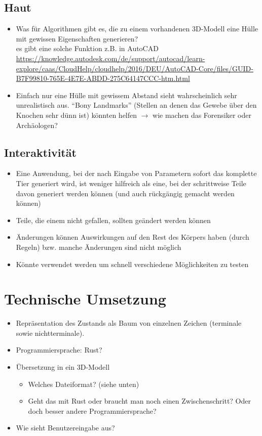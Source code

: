 \section{Haut}

\begin{itemize}
 \item Was für Algorithmen gibt es, die zu einem vorhandenen 3D-Modell eine Hülle mit gewissen Eigenschaften generieren? \\
 es gibt eine solche Funktion z.B. in AutoCAD \url{https://knowledge.autodesk.com/de/support/autocad/learn-explore/caas/CloudHelp/cloudhelp/2016/DEU/AutoCAD-Core/files/GUID-B7F99810-765E-4E7E-ABDD-275C64147CCC-htm.html}
 \item Einfach nur eine Hülle mit gewissem Abstand sieht wahrscheinlich sehr unrealistisch aus. "`Bony Landmarks"' (Stellen an denen das Gewebe über den Knochen sehr dünn ist) könnten helfen $\rightarrow$ wie machen das Forensiker oder Archäologen? %
\end{itemize}

\section{Interaktivität}

\begin{itemize}
 \item Eine Anwendung, bei der nach Eingabe von Parametern sofort das komplette Tier generiert wird, ist weniger hilfreich als eine, bei der schrittweise Teile davon generiert werden können (und auch rückgängig gemacht werden können)
 \item Teile, die einem nicht gefallen, sollten geändert werden können
 \item Änderungen können Auswirkungen auf den Rest des Körpers haben (durch Regeln) bzw. manche Änderungen sind nicht möglich
 \item Könnte verwendet werden um schnell verschiedene Möglichkeiten zu testen
\end{itemize}


\chapter{Technische Umsetzung}

\begin{itemize}
 \item Repräsentation des Zustands als Baum von einzelnen Zeichen (terminale sowie nichtterminale).
 \item Programmiersprache: Rust?
 \item Übersetzung in ein 3D-Modell
    \begin{itemize}
     \item Welches Dateiformat? (siehe unten)
     \item Geht das mit Rust oder braucht man noch einen Zwischenschritt? Oder doch besser andere Programmiersprache?
    \end{itemize}
 \item Wie sieht Benutzereingabe aus?
\end{itemize}




